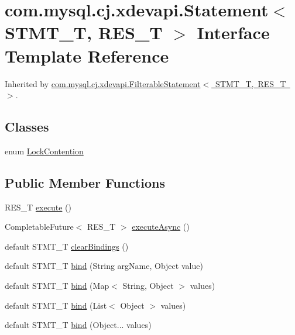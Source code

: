 \hypertarget{interfacecom_1_1mysql_1_1cj_1_1xdevapi_1_1_statement}{}\section{com.\+mysql.\+cj.\+xdevapi.\+Statement$<$ S\+T\+M\+T\+\_\+T, R\+E\+S\+\_\+T $>$ Interface Template Reference}
\label{interfacecom_1_1mysql_1_1cj_1_1xdevapi_1_1_statement}


Inherited by \mbox{\hyperlink{classcom_1_1mysql_1_1cj_1_1xdevapi_1_1_filterable_statement}{com.\+mysql.\+cj.\+xdevapi.\+Filterable\+Statement$<$ S\+T\+M\+T\+\_\+\+T, R\+E\+S\+\_\+\+T $>$}}.

\subsection*{Classes}
\begin{DoxyCompactItemize}
\item 
enum \mbox{\hyperlink{enumcom_1_1mysql_1_1cj_1_1xdevapi_1_1_statement_1_1_lock_contention}{Lock\+Contention}}
\end{DoxyCompactItemize}
\subsection*{Public Member Functions}
\begin{DoxyCompactItemize}
\item 
R\+E\+S\+\_\+T \mbox{\hyperlink{interfacecom_1_1mysql_1_1cj_1_1xdevapi_1_1_statement_ae92dce50b119561fd532303ad491c610}{execute}} ()
\item 
Completable\+Future$<$ R\+E\+S\+\_\+T $>$ \mbox{\hyperlink{interfacecom_1_1mysql_1_1cj_1_1xdevapi_1_1_statement_abb6aa6d3f4b3088af1a2f81a50eeab49}{execute\+Async}} ()
\item 
default S\+T\+M\+T\+\_\+T \mbox{\hyperlink{interfacecom_1_1mysql_1_1cj_1_1xdevapi_1_1_statement_a7be7ea383c05f9b1662b75eed8982ff1}{clear\+Bindings}} ()
\item 
default S\+T\+M\+T\+\_\+T \mbox{\hyperlink{interfacecom_1_1mysql_1_1cj_1_1xdevapi_1_1_statement_ad4a21af767982f02e50d244b705ee24b}{bind}} (String arg\+Name, Object value)
\item 
default S\+T\+M\+T\+\_\+T \mbox{\hyperlink{interfacecom_1_1mysql_1_1cj_1_1xdevapi_1_1_statement_a4541c17d970821bc7dd87beec7e5d0a1}{bind}} (Map$<$ String, Object $>$ values)
\item 
default S\+T\+M\+T\+\_\+T \mbox{\hyperlink{interfacecom_1_1mysql_1_1cj_1_1xdevapi_1_1_statement_a890c1608844aebef556cfe1a0638951d}{bind}} (List$<$ Object $>$ values)
\item 
default S\+T\+M\+T\+\_\+T \mbox{\hyperlink{interfacecom_1_1mysql_1_1cj_1_1xdevapi_1_1_statement_a9e14b71e366a4df30062bc2682751165}{bind}} (Object... values)
\end{DoxyCompactItemize}


